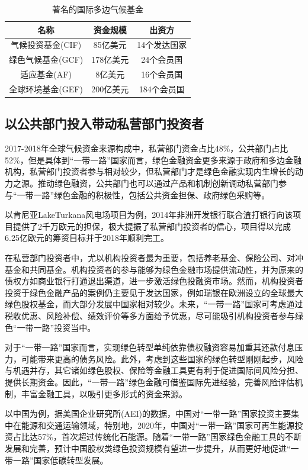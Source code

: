 \documentclass[a4paper,12pt]{ctexart}
\begin{document}
\begin{table}[H]
    \centering
    \begin{tabular}{|c|c|c|}
        \hline
        名称          & 资金规模   & 出资方\\\hline
        气候投资基金(CIF) & 85亿美元  & 14个发达国家      \\
        绿色气候基金(GCF) & 178亿美元 & 24个会员国       \\
        适应基金(AF)    & 8亿美元   & 16个会员国       \\
        全球环境基金(GEF) & 200亿美元 & 184个会员国      \\\hline
    \end{tabular}
    \caption{著名的国际多边气候基金}
\end{table}

\subsection*{以公共部门投入带动私营部门投资者}

2017-2018年全球气候资金来源构成中，私营部门资金占比48\%，公共部门占比52\%，但是具体到“一带一路”国家而言，绿色金融资金更多来源于政府和多边金融机构，私营部门投资者参与相对较少，但私营部门才是绿色金融实现内生增长的动力之源。推动绿色融资，公共部门也可以通过产品和机制创新调动私营部门参与“一带一路”绿色金融的积极性，包括公共资金担保、政府绿色采购等。

以肯尼亚LakeTurkana风电场项目为例，2014年非洲开发银行联合渣打银行向该项目提供了2千万欧元的担保，极大提振了私营部门投资者的信心，项目得以完成6.25亿欧元的筹资目标并于2018年顺利完工。

在私营部门投资者中，尤以机构投资者最为重要，包括养老基金、保险公司、对冲基金和共同基金。机构投资者的参与能够为绿色金融市场提供流动性，并为原来的债权方如商业银行打通退出渠道，进一步激活绿色投融资市场。然而，机构投资者投资于绿色金融产品的案例仍主要见于发达国家，例如瑞银在欧洲设立的全球最大绿色股权基金，而大部分发展中国家相对较少。未来，“一带一路”国家可考虑通过税收优惠、风险补偿、绩效评价等多方面给予优惠，尽可能吸引机构投资者参与绿色“一带一路”投资当中。

对于“一带一路”国家而言，实现绿色转型单纯依靠债权融资容易加重其还款付息压力，可能带来更高的债务风险。此外，考虑到这些国家的绿色转型刚刚起步，风险与机遇并存，其它诸如绿色股权、保险等金融工具更有利于促进国际间风险分担、提供长期资金。因此，“一带一路”绿色金融可借鉴国际先进经验，完善风险评估机制，丰富金融工具，以吸引更多形式的资金来源。

以中国为例，据美国企业研究所(AEI)的数据，中国对“一带一路”国家投资主要集中在能源和交通运输领域，特别地，2020年，中国对“一带一路”国家可再生能源投资占比达57\%，首次超过传统化石能源。随着“一带一路”国家绿色金融工具的不断发展和完善，预计中国股权类绿色投资规模有望进一步提升，从而更好地促进“一带一路”国家低碳转型发展。
\end{document}
